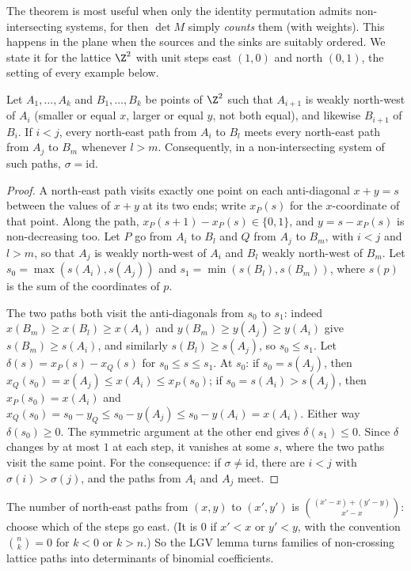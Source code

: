 The theorem is most useful when only the identity permutation admits non-intersecting systems, for then $\det M$ simply
\emph{counts} them (with weights). This happens in the plane when the sources and the sinks are suitably ordered. We
state it for the lattice $\Z^2$ with unit steps east $(1,0)$ and north $(0,1)$, the setting of every example below.

\begin{lemma}\label{lem:planar}
Let $A_1,\dots,A_k$ and $B_1,\dots,B_k$ be points of $\Z^2$ such that $A_{i+1}$ is weakly north-west of $A_i$ (smaller or
equal $x$, larger or equal $y$, not both equal), and likewise $B_{i+1}$ of $B_i$. If $i<j$, every north-east path from
$A_i$ to $B_l$ meets every north-east path from $A_j$ to $B_m$ whenever $l>m$. Consequently, in a non-intersecting system
of such paths, $\sigma=\mathrm{id}$.
\end{lemma}
\begin{proof}
A north-east path visits exactly one point on each anti-diagonal $x+y=s$ between the values of $x+y$ at its two ends;
write $x_P(s)$ for the $x$-coordinate of that point. Along the path, $x_P(s+1)-x_P(s)\in\{0,1\}$, and $y=s-x_P(s)$ is
non-decreasing too. Let $P$ go from $A_i$ to $B_l$ and $Q$ from $A_j$ to $B_m$, with $i<j$ and $l>m$, so that $A_j$ is weakly
north-west of $A_i$ and $B_l$ weakly north-west of $B_m$. Let $s_0=\max(s(A_i),s(A_j))$ and $s_1=\min(s(B_l),s(B_m))$, where
$s(p)$ is the sum of the coordinates of $p$.

The two paths both visit the anti-diagonals from $s_0$ to $s_1$: indeed $x(B_m)\ge x(B_l)\ge x(A_i)$ and $y(B_m)\ge y(A_j)\ge
y(A_i)$ give $s(B_m)\ge s(A_i)$, and similarly $s(B_l)\ge s(A_j)$, so $s_0\le s_1$. Let $\delta(s)=x_P(s)-x_Q(s)$ for
$s_0\le s\le s_1$. At $s_0$: if $s_0=s(A_j)$, then $x_Q(s_0)=x(A_j)\le x(A_i)\le x_P(s_0)$; if $s_0=s(A_i)>s(A_j)$, then
$x_P(s_0)=x(A_i)$ and $x_Q(s_0)=s_0-y_Q\le s_0-y(A_j)\le s_0-y(A_i)=x(A_i)$. Either way $\delta(s_0)\ge0$. The symmetric argument at
the other end gives $\delta(s_1)\le0$. Since $\delta$ changes by at most $1$ at each step, it vanishes at some $s$, where
the two paths visit the same point. For the consequence: if $\sigma\ne\mathrm{id}$, there are $i<j$ with $\sigma(i)>\sigma(j)$, and
the paths from $A_i$ and $A_j$ meet.
\end{proof}

The number of north-east paths from $(x,y)$ to $(x',y')$ is $\binom{(x'-x)+(y'-y)}{x'-x}$: choose which of the steps go
east. (It is $0$ if $x'<x$ or $y'<y$, with the convention $\binom nk=0$ for $k<0$ or $k>n$.) So the LGV lemma turns
families of non-crossing lattice paths into determinants of binomial coefficients.

